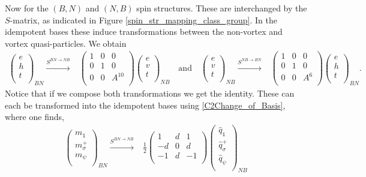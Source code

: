 \documentclass[12pt,a4paper]{article}
\newcounter{arrow}
\newcommand{\unit}{\mathds{1}}
\begin{document}
Now for the $(B,N)$ and $(N,B)$ spin structures.
These are interchanged by the $S$-matrix, as indicated in Figure \ref{spin_str_mapping_class_group}.
In the idempotent bases these induce transformations between the non-vortex and vortex quasi-particles.
We obtain 
\begin{align}
\left( \begin{matrix}
e\\
h\\
t\\
\end{matrix} \right)_{BN} 
\xrightarrow{S^{BN \rightarrow NB}} & \left( \begin{matrix}
1&0&0\\
0&1&0\\
0&0&A^{10}\\
\end{matrix} \right)
\left( \begin{matrix}
e\\
v\\
t\\
\end{matrix} \right)_{NB}
\quad \text{and} \quad 
\left( \begin{matrix}
e\\
v\\
t\\
\end{matrix} \right)_{NB} 
\xrightarrow{S^{NB \rightarrow BN}} & \left( \begin{matrix}
1&0&0\\
0&1&0\\
0&0&A^{6}\\
\end{matrix} \right)
\left( \begin{matrix}
e\\
h\\
t\\
\end{matrix} \right)_{BN}.
\end{align}
Notice that if we compose both transformations we get the identity. 
These can each be transformed into the idempotent bases using \eqref{C2Change_of_Basis}, 
where one finds,
\begin{align}
\left( \begin{matrix}
m_\unit\\
m_\sigma^+\\
m_\psi\\
\end{matrix} \right)_{BN} 
\xrightarrow{S^{BN \rightarrow NB}} &\frac{1}{2} \left( \begin{matrix}
1&d&1\\
-d&0&d\\
-1&d&-1\\
\end{matrix} \right)
\left( \begin{matrix}
\hat{q}_\unit\\
\hat{q}_\sigma^+\\
\hat{q}_\psi\\
\end{matrix} \right)_{NB}
\end{align}
\end{document}
